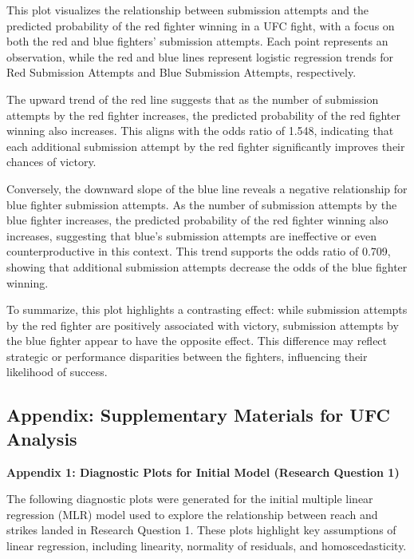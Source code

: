\documentclass[
  letterpaper,
  DIV=11,
  numbers=noendperiod]{scrartcl}
\begin{document}
This plot visualizes the relationship between submission attempts and
the predicted probability of the red fighter winning in a UFC fight,
with a focus on both the red and blue fighters' submission attempts.
Each point represents an observation, while the red and blue lines
represent logistic regression trends for Red Submission Attempts and
Blue Submission Attempts, respectively.

The upward trend of the red line suggests that as the number of
submission attempts by the red fighter increases, the predicted
probability of the red fighter winning also increases. This aligns with
the odds ratio of 1.548, indicating that each additional submission
attempt by the red fighter significantly improves their chances of
victory.

Conversely, the downward slope of the blue line reveals a negative
relationship for blue fighter submission attempts. As the number of
submission attempts by the blue fighter increases, the predicted
probability of the red fighter winning also increases, suggesting that
blue's submission attempts are ineffective or even counterproductive in
this context. This trend supports the odds ratio of 0.709, showing that
additional submission attempts decrease the odds of the blue fighter
winning.

To summarize, this plot highlights a contrasting effect: while
submission attempts by the red fighter are positively associated with
victory, submission attempts by the blue fighter appear to have the
opposite effect. This difference may reflect strategic or performance
disparities between the fighters, influencing their likelihood of
success.

\subsection{Appendix: Supplementary Materials for UFC
Analysis}\label{appendix-supplementary-materials-for-ufc-analysis}

\textbf{Appendix 1: Diagnostic Plots for Initial Model (Research
Question 1)}

The following diagnostic plots were generated for the initial multiple
linear regression (MLR) model used to explore the relationship between
reach and strikes landed in Research Question 1. These plots highlight
key assumptions of linear regression, including linearity, normality of
residuals, and homoscedasticity.
\end{document}
